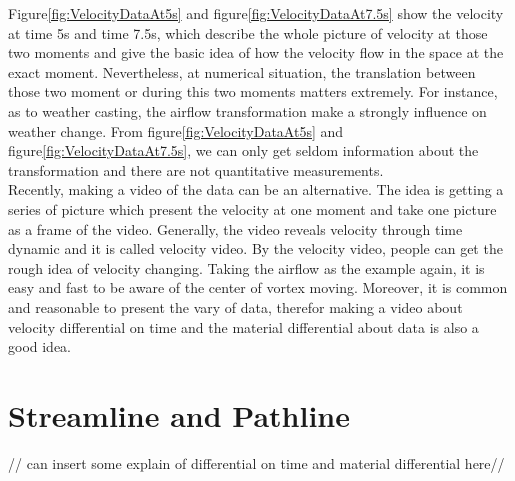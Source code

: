 \documentclass[
     11pt,         %
     a4paper,      %
     oneside,
     ]{article}
\begin{document}
	Figure\ref{fig:VelocityDataAt5s} and figure\ref{fig:VelocityDataAt7.5s} show the velocity at time 5s and time 7.5s, which describe the whole picture of velocity at those two moments and give the basic idea of how the velocity flow in the space at the exact moment. Nevertheless, at numerical situation, the translation between those two moment or during this two moments matters extremely. For instance, as to weather casting, the airflow transformation make a strongly influence on weather change. From figure\ref{fig:VelocityDataAt5s} and figure\ref{fig:VelocityDataAt7.5s}, we can only get seldom information about the transformation and there are not quantitative measurements.\\
	Recently, making a video of the data can be an alternative. The idea is getting a series of picture which present the velocity at one moment and take one picture as a frame of the video. Generally, the video reveals velocity through time dynamic and it is called velocity video. By the velocity video, people can get the rough idea of velocity changing. Taking the airflow as the example again, it is easy and fast to be aware of the center of vortex moving. Moreover, it is common and reasonable to present the vary of data, therefor making a video about velocity differential on time and the material differential about data is also a good idea.\\
	
	\section{Streamline and Pathline}

    // can insert some explain of differential on time and material differential here//\\
\end{document}
